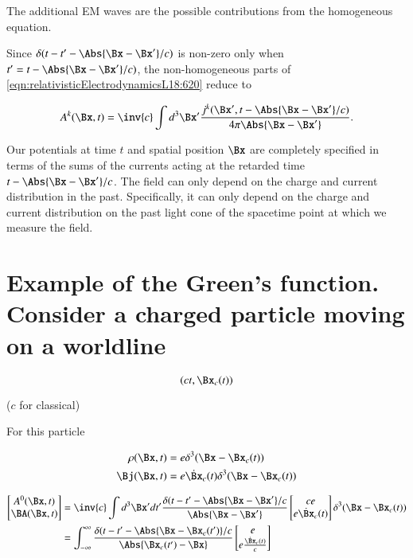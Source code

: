 The additional EM waves are the possible contributions from the homogeneous equation.

Since $\delta(t - t' - \Abs{\Bx -\Bx'}/c)$ is non-zero only when $t' = t - \Abs{\Bx -\Bx'}/c)$, the non-homogeneous parts of \ref{eqn:relativisticElectrodynamicsL18:620} reduce to

\begin{equation}\label{eqn:relativisticElectrodynamicsL18:625}
A^k(\Bx, t) = \inv{c} \int d^3 \Bx' 
\frac{j^k(\Bx', t - \Abs{\Bx - \Bx'}/c)}{4 \pi \Abs{\Bx - \Bx'}}.
\end{equation}

Our potentials at time $t$ and spatial position $\Bx$ are completely specified in terms of the sums of the currents acting at the retarded time $t - \Abs{\Bx - \Bx'}/c$.  The field can only depend on the charge and current distribution in the past.  Specifically, it can only depend on the charge and current distribution on the past light cone of the spacetime point at which we measure the field.

\section{Example of the Green's function.  Consider a charged particle moving on a worldline}

\begin{equation}\label{eqn:relativisticElectrodynamicsL18:150}
(c t, \Bx_c(t))
\end{equation}

($c$ for classical)

For this particle

\begin{align}\label{eqn:relativisticElectrodynamicsL18:170}
\rho(\Bx, t) &= e \delta^3(\Bx - \Bx_c(t)) \\
\Bj(\Bx, t) &= e \dot{\Bx}_c(t) \delta^3(\Bx - \Bx_c(t))
\end{align}

\begin{align*}
\begin{bmatrix}
A^0(\Bx, t) \\
\BA(\Bx, t)
\end{bmatrix}
&=
\inv{c}
\int d^3 \Bx' dt'
\frac{ \delta( t - t' - \Abs{\Bx - \Bx'}/c }{\Abs{\Bx - \Bx'}}
\begin{bmatrix}
c e \\
e \dot{\Bx}_c(t)
\end{bmatrix}
\delta^3(\Bx - \Bx_c(t)) \\
&=
\int_{-\infty}^\infty
\frac{ \delta( t - t' - \Abs{\Bx - \Bx_c(t')}/c }{\Abs{\Bx_c(t') - \Bx}}
\begin{bmatrix}
e \\
e \frac{\dot{\Bx}_c(t)}{c}
\end{bmatrix}
\end{align*}

